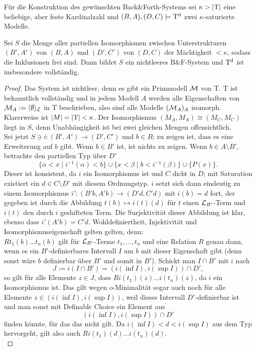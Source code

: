 \newpage
Für die Konstruktion des gewünschten Back\&Forth-Systems sei $\kappa>{\left| \operatorname{T} \right|}$ eine beliebige, aber feste Kardinalzahl und $(B,A),(D,C)\models\operatorname{T^d}$ zwei $\kappa$-saturierte Modelle.
\begin{theorem}\label{BackForth}
	Sei $S$ die Menge aller partiellen Isomorphismen zwischen Unterstrukturen $(B',A')$ von $(B,A)$ und $(D',C')$ von $(D,C)$ der Mächtigkeit $<\kappa$, sodass die Inklusionen frei sind. Dann bildet $S$ ein nichtleeres B\&F-System und $\operatorname{T^d}$ ist insbesondere vollständig.
\end{theorem}
\begin{proof}
	Das System ist nichtleer, denn es gibt ein Primmodell $\mathcal{M}$ von T. T ist bekanntlich vollständig und in jedem Modell $A$ werden alle Eigenschaften von $\mathcal{M}_A:=\langle\emptyset\rangle_{\mathcal{L}}$ in T beschrieben, also sind alle Modelle $(\mathcal{M}_A)_A$ isomorph. Klarerweise ist ${\left| M \right|}={\left| \operatorname{T} \right|}<\kappa$. Der Isomorphismus $(M_A,M_A)\cong(M_C,M_C)$ liegt in $S$, denn Unabhängigkeit ist bei zwei gleichen Mengen offensichtlich.\\
	Sei jetzt $S\ni i:(B',A')\rightarrow(D',C')$ und $b\in B$; zu zeigen ist, dass es eine Erweiterung auf $b$ gibt. Wenn $b\in B'$ ist, ist nichts zu zeigen. Wenn $b\in A\setminus B'$, betrachte den partiellen Typ über $D'$ $$\{\alpha<x\mid i^{-1}(\alpha)<b\}\cup\{x<\beta\mid b<i^{-1}(\beta)\}\cup\{P(x)\}.$$
	Dieser ist konsistent, da $i$ ein Isomorphismus ist und $C$ dicht in $D$; mit Saturation existiert ein $d\in C\setminus D'$ mit diesem Ordnungstyp. $i$ setzt sich dann eindeutig zu einem Isomorphismus $i':(B'b,A'b)\rightarrow(D'd,C'd)$ mit $i(b)=d$ fort, der gegeben ist durch die Abbildung $t(b)\mapsto i(t)(d)$ für $t$ einen $\mathcal{L}_{B'}$-Term und $i(t)$ den durch $i$ geshifteten Term. Die Surjektivität dieser Abbildung ist klar, ebenso dass $i'(A'b)=C'd$. Wohldefiniertheit, Injektivität und Isomorphismuseigenschaft gelten gelten, denn:\\
	$Rt_1(b)\dots t_n(b)$ gilt für $\mathcal{L}_{B'}$-Terme $t_1,\dots,t_n$ und eine Relation $R$ genau dann, wenn es ein $B'$-definierbares Intervall $I$ um $b$ mit dieser Eigenschaft gibt (denn sonst wäre $b$ definierbar über $B'$ und somit in $B'$). Schickt man $I\cap B'$ mit $i$ nach $$J:=i(I\cap B')=(i(\inf I),i(\sup I))\cap D',$$ so gilt für alle Elemente $z\in J$, dass $Ri(t_1)(z)\dots i(t_n)(z)$, da $i$ ein Isomorphismus ist. Das gilt wegen o-Minimalität sogar auch noch für alle Elemente $z\in(i(\inf I),i(\sup I))$, weil dieses Intervall $D'$-definierbar ist und man sonst mit Definable Choice ein Element aus $$(i(\inf I),i(\sup I))\cap D'$$ finden könnte, für das das nicht gilt. Da $i(\inf I)<d<i(\sup I)$ aus dem Typ hervorgeht, gilt also auch $Ri(t_1)(d)\dots i(t_n)(d)$.\\

\end{proof}
